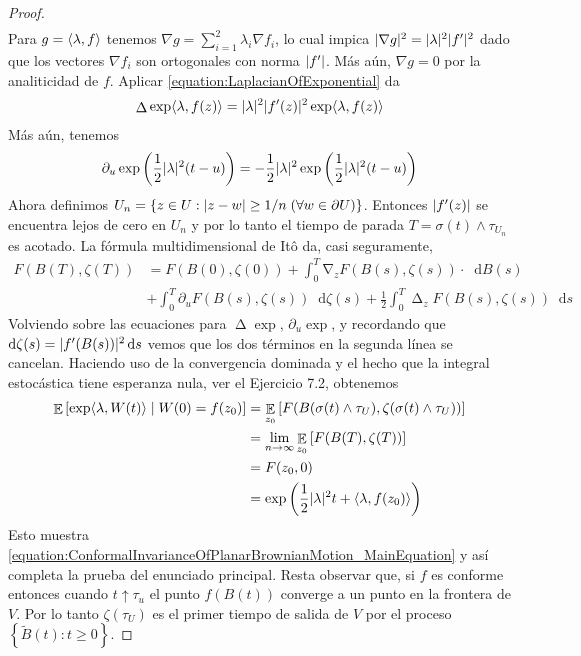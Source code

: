 \documentclass{report}
\newcommand{\ito}{Itô}
\newcommand{\brownian}{B}
\newcommand{\alteredBrownian}{\widetilde{\brownian}}
\newcommand{\wiener}{W}
\newcommand{\dd}{\mathop{}\!\mathrm{d}}
\DeclareMathOperator{\laplacian}{\Delta}
\DeclareMathOperator{\grad}{\nabla}
\DeclareMathOperator{\Expectation}{\mathbb{E}}
\DeclarePairedDelimiter{\abs}{\lvert}{\rvert}
\DeclarePairedDelimiter{\ang}{\langle}{\rangle}
\theoremstyle{plain}
\theoremstyle{remark}
\theoremstyle{definition}
\begin{document}
\begin{proof}
\begin{align}
  \end{align}
  Para \(g = \ang{\lambda , f}\) tenemos \(\nabla g = \sum_{i = 1}^2 \lambda_i \nabla f_i\), lo cual impica \(\abs{\nabla g}^2 = \abs{\lambda}^2 \abs{f'}^2\) dado que los vectores \(\nabla f_i\) son ortogonales con norma \(\abs{f'}\).
  Más aún, \(\nabla g = 0\) por la analiticidad de \(f\).
  Aplicar \ref{equation:LaplacianOfExponential} da
  \begin{align}
    \laplacian \exp \ang{\lambda, f(z)}
    =
    \abs{\lambda}^2 \abs{f'(z)}^2 \exp \ang{\lambda, f(z)}
  \end{align}
  Más aún, tenemos
  \begin{align}
    \partial_u \exp\left( \frac{1}{2} \abs{\lambda}^2 (t - u) \right)
    =
    - \frac{1}{2} \abs{\lambda}^2 \exp\left( \frac{1}{2} \abs{\lambda}^2 (t - u)\right)
  \end{align}
  Ahora definimos \(U_n = \{z \in U : \abs{z - w} \geq 1 / n \;(\forall w \in \partial U)\}\).
  Entonces \(\abs{f'(z)}\) se encuentra lejos de cero en \(U_n\) y por lo tanto el tiempo de parada \(T = \sigma(t) \wedge \tau_{U_n}\) es acotado.
  La fórmula multidimensional de \ito{} da, casi seguramente,
  \begin{align}
    F(\brownian(T), \zeta(T))
    &=
    F(\brownian(0), \zeta(0))
    + \int_0^T \grad_z F(\brownian(s), \zeta(s)) \cdot \dd \brownian(s)
    \\
    &+
    \int_0^T \partial_u F(\brownian(s), \zeta(s)) \dd \zeta(s)
    + \frac{1}{2} \int_0^T \laplacian_z F(\brownian(s), \zeta(s)) \dd s
  \end{align}
  Volviendo sobre las ecuaciones para \(\laplacian \exp\), \(\partial_u \exp\), y recordando que \(\dd \zeta(s) = \abs{f'(\brownian(s))}^2 \dd s\) vemos que los dos términos en la segunda línea se cancelan.
  Haciendo uso de la convergencia dominada y el hecho que la integral estocástica tiene esperanza nula, ver el Ejercicio 7.2, obtenemos
  \begin{align}
    \Expectation \left[
      \exp \ang{\lambda, \wiener(t)}
      \mid
      \wiener(0) = f(z_0)
    \right]
    &=
    \Expectation_{z_0} \left[ F(\brownian(\sigma(t) \wedge \tau_U), \zeta(\sigma(t) \wedge \tau_U))\right]
    \\
    &=
    \lim_{n \rightarrow \infty} \Expectation_{z_0} \left[F(\brownian(T), \zeta(T))\right]
    \\
    &=
    F(z_0, 0)
    \\
    &=
    \exp \left( \frac{1}{2} \abs{\lambda}^2 t + \ang{\lambda, f(z_0)} \right)
  \end{align}
  Esto muestra \eqref{equation:ConformalInvarianceOfPlanarBrownianMotion_MainEquation} y así completa la prueba del enunciado principal.
  Resta observar que, si \(f\) es conforme entonces cuando \(t \uparrow \tau_u\) el punto \(f(\brownian(t))\) converge a un punto en la frontera de \(V\).
  Por lo tanto \(\zeta(\tau_U)\) es el primer tiempo de salida de \(V\) por el proceso \(\left\{ \alteredBrownian(t) : t \geq 0 \right\}\).
\end{proof}
\end{document}
